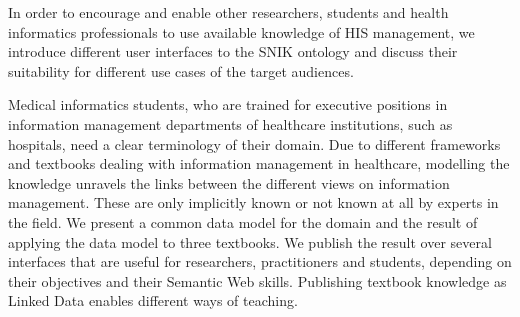 \documentclass{IOS-Book-Article}     %
\begin{document}
In order to encourage and enable other researchers, students and health informatics professionals to use available knowledge of HIS management, we introduce different user interfaces to the SNIK ontology and discuss their suitability for different use cases of the target audiences.

Medical informatics students, who are trained for executive positions in information management departments of healthcare institutions, such as hospitals, need a clear terminology of their domain.
Due to different frameworks and textbooks dealing with information management in healthcare, modelling the knowledge unravels the links between the different views on information management.
These are only implicitly known or not known at all by experts in the field.
%
We present a common data model for the domain and the result of applying the data model to three textbooks.
We publish the result over several interfaces that are useful for researchers, practitioners and students, depending on their objectives and their Semantic Web skills.
%
Publishing textbook knowledge as Linked Data enables different ways of teaching.
\end{document}
